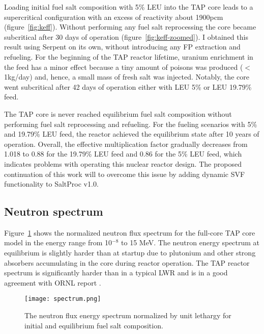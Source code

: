 Loading initial fuel salt composition with 5\% \gls{LEU} into the \gls{TAP} 
core leads to a supercritical configuration with an excess of reactivity about 
1900pcm (figure~\ref{fig:keff}). Without performing any fuel salt reprocessing 
the core became subcritical after 30 days of operation  
(figure~\ref{fig:keff-zoomed}). I obtained this result using Serpent on its 
own, without introducing any \gls{FP} extraction and refueling. For the 
beginning of the \gls{TAP} reactor lifetime, uranium enrichment in the feed 
has a minor effect because a tiny amount of poisons was produced ($<$1kg/day) 
and, hence, a small mass of fresh salt was injected. Notably, the core went 
subcritical after 42 days of operation either with \gls{LEU} 5\% or \gls{LEU} 
19.79\% feed.

The \gls{TAP} core is never reached equilibrium fuel salt composition without 
performing fuel salt reprocessing and refueling. For the fueling scenarios 
with 5\% and 19.79\% \gls{LEU} feed, the reactor achieved the equilibrium 
state after 10 years of operation. Overall, the effective multiplication 
factor gradually decreases from 1.018 to 0.88 for the 19.79\% \gls{LEU} feed 
and 0.86 for the 5\% \gls{LEU} feed, which indicates problems with operating 
this nuclear reactor design. The proposed continuation of this work will to 
overcome this issue by adding dynamic \gls{SVF} functionality to SaltProc v1.0.

\subsection{Neutron spectrum}
Figure~\ref{fig:spectrum} shows the normalized neutron flux spectrum for the 
full-core \gls{TAP} core model in the energy range from 10$^{-8}$ to 15 MeV. 
The neutron energy spectrum at equilibrium is slightly harder than at 
startup due to plutonium and other strong absorbers accumulating in the 
core during reactor operation. The \gls{TAP} reactor spectrum is significantly 
harder than in a typical \gls{LWR} and is in a good agreement with 
\gls{ORNL} report \cite{betzler_assessment_2017}.
\begin{figure}[htp!] %
	\centering
	\texttt{[image: spectrum.png]}
	\caption{The neutron flux energy spectrum normalized by unit lethargy 
		for initial and equilibrium fuel salt composition.}
	\label{fig:spectrum}
\end{figure}
